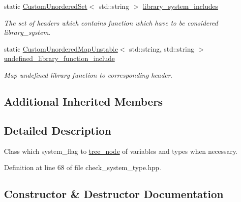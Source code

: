 \begin{DoxyCompactItemize}
static \hyperlink{classCustomUnorderedSet}{Custom\+Unordered\+Set}$<$ std\+::string $>$ \hyperlink{classCheckSystemType_a921be1aeea25c77292b88e96d40882a5}{library\+\_\+system\+\_\+includes}
\begin{DoxyCompactList}\small\item\em The set of headers which contains function which have to be considered library\+\_\+system. \end{DoxyCompactList}\item 
static \hyperlink{custom__map_8hpp_a8cbaceffc09790a885ec7e9c17809c69}{Custom\+Unordered\+Map\+Unstable}$<$ std\+::string, std\+::string $>$ \hyperlink{classCheckSystemType_aac63e0fa17f7acc5d7fd9215c5d19e87}{undefined\+\_\+library\+\_\+function\+\_\+include}
\begin{DoxyCompactList}\small\item\em Map undefined library function to corresponding header. \end{DoxyCompactList}\end{DoxyCompactItemize}
\subsection*{Additional Inherited Members}


\subsection{Detailed Description}
Class which system\+\_\+flag to \hyperlink{classtree__node}{tree\+\_\+node} of variables and types when necessary. 

Definition at line 68 of file check\+\_\+system\+\_\+type.\+hpp.



\subsection{Constructor \& Destructor Documentation}
\mbox{\label{classCheckSystemType_a906a6f4b26c4875ed202946089edc1f8}} 
